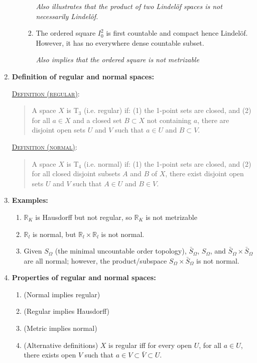 \documentclass[letterpaper, 12pt]{article}
\newcommand{\RR}{\mathbb{R}}
\newcommand{\Taxiom}[1]{T$_\text{#1}$}
\newcommand{\defn}[2]{\textsc{\underline{Definition (#1)}:}\begin{quote} #2\end{quote}}
\begin{document}
\begin{enumerate}[resume]
\begin{enumerate}
\begin{enumerate}
                \textit{Also illustrates that the product of two Lindel\"of spaces is not necessarily Lindel\"of.}

            \item The ordered square $I_0^2$ is first countable and compact hence Lindel\"of. However, it has no everywhere dense countable subset.

                \textit{Also implies that the ordered square is not metrizable}
            \end{enumerate}
    \end{enumerate}
    \item \textbf{Definition of regular and normal spaces:}

        \defn{regular}{A space $X$ is \Taxiom{3} (i.e. regular) if: (1) the 1-point sets are closed, and (2) for all $a\in X$ and a closed set $B\subset X$ not containing $a$, there are disjoint open sets $U$ and $V$ such that $a\in U$ and $B\subset V$.}

        \defn{normal}{A space $X$ is \Taxiom{4} (i.e. normal) if: (1) the 1-point sets are closed, and (2) for all closed disjoint subsets $A$ and $B$ of $X$, there exist disjoint open sets $U$ and $V$ such that $A\in U$ and $B\in V$.}
    \item \textbf{Examples:}
        \begin{enumerate}
        \item $\RR_K$ is Hausdorff but not regular, so $\RR_K$ is not metrizable
        \item $\RR_l$ is normal, but $\RR_l\times\RR_l$ is not normal.
        \item Given $S_\Omega$ (the minimal uncountable order topology), $\bar S_\Omega$, $S_\Omega$, and $\bar S_\Omega \times \bar S_\Omega$ are all normal; however, the product/subspace $S_\Omega \times \bar S_\Omega$ is not normal.
        \end{enumerate}
    \item \textbf{Properties of regular and normal spaces:}
        \begin{enumerate}
        \item (Normal implies regular)
        \item (Regular implies Hausdorff)
        \item (Metric implies normal)
        \item (Alternative definitions) $X$ is regular iff for every open $U$, for all $a\in U$, there exists open $V$ such that $a\in V \subset \bar V \subset U$.


\end{enumerate}
\end{enumerate}
\end{document}
